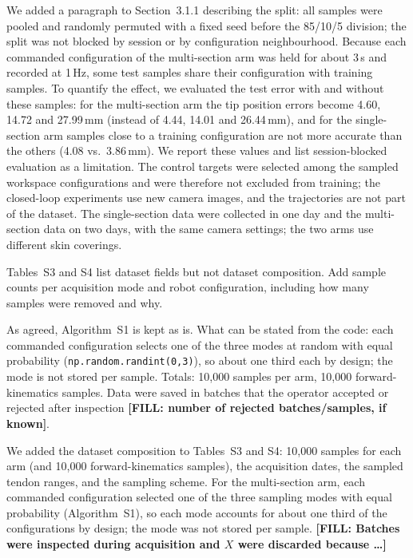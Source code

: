 \documentclass[10pt,a4paper]{article}
\newcommand{\FILL}[1]{\textcolor{orange!85!black}{\textbf{[FILL: #1]}}}
\begin{document}
\begin{resp}
We added a paragraph to Section~3.1.1 describing the split: all samples were pooled and randomly permuted with a fixed seed before the 85/10/5 division; the split was not blocked by session or by configuration neighbourhood. Because each commanded configuration of the multi-section arm was held for about 3\,s and recorded at 1\,Hz, some test samples share their configuration with training samples. To quantify the effect, we evaluated the test error with and without these samples: for the multi-section arm the tip position errors become 4.60, 14.72 and 27.99\,mm (instead of 4.44, 14.01 and 26.44\,mm), and for the single-section arm samples close to a training configuration are not more accurate than the others (4.08 vs.\ 3.86\,mm). We report these values and list session-blocked evaluation as a limitation. The control targets were selected among the sampled workspace configurations and were therefore not excluded from training; the closed-loop experiments use new camera images, and the trajectories are not part of the dataset. The single-section data were collected in one day and the multi-section data on two days, with the same camera settings; the two arms use different skin coverings.
\end{resp}

\begin{rev}
Tables~S3 and S4 list dataset fields but not dataset composition. Add sample counts per acquisition mode and robot configuration, including how many samples were removed and why.
\end{rev}
\begin{todo}
As agreed, Algorithm~S1 is kept as is. What can be stated from the code: each commanded configuration selects one of the three modes at random with equal probability (\texttt{np.random.randint(0,3)}), so about one third each by design; the mode is not stored per sample. Totals: 10,000 samples per arm, 10,000 forward-kinematics samples. Data were saved in batches that the operator accepted or rejected after inspection \FILL{number of rejected batches/samples, if known}.
\end{todo}
\begin{resp}
We added the dataset composition to Tables~S3 and S4: 10,000 samples for each arm (and 10,000 forward-kinematics samples), the acquisition dates, the sampled tendon ranges, and the sampling scheme. For the multi-section arm, each commanded configuration selected one of the three sampling modes with equal probability (Algorithm~S1), so each mode accounts for about one third of the configurations by design; the mode was not stored per sample. \FILL{Batches were inspected during acquisition and $X$ were discarded because \dots}
\end{resp}
\end{document}
